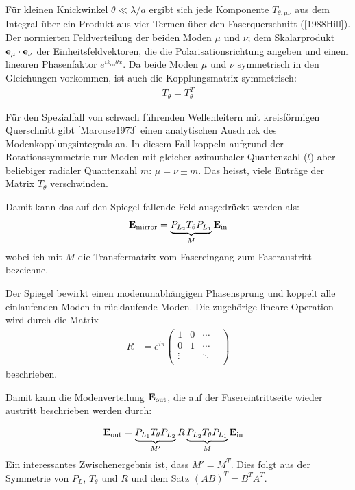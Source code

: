 \documentclass{article}
\begin{document}
F\"ur kleinen Knickwinkel $\theta \ll \lambda/a$ ergibt sich jede
Komponente $T_{\theta,\mu\nu}$ aus dem Integral \"uber ein Produkt aus
vier Termen \"uber den Faserquerschnitt ([1988Hill]). Der normierten
Feldverteilung der beiden Moden $\mu$ und $\nu$; dem Skalarprodukt
${\bf e_\mu\cdot e_\nu}$ der Einheitsfeldvektoren, die die
Polarisationsrichtung angeben und einem linearen Phasenfaktor
$e^{ik_\textrm{co}\theta x}$. Da beide Moden $\mu$ und $\nu$
symmetrisch in den Gleichungen vorkommen, ist auch die Kopplungsmatrix
symmetrisch:
\begin{align}
  T_\theta=T_\theta^T  
\end{align}


F\"ur den Spezialfall von schwach f\"uhrenden Wellenleitern mit
kreisf\"ormigen Querschnitt gibt [Marcuse1973] einen analytischen
Ausdruck des Modenkopplungsintegrals an. In diesem Fall koppeln
aufgrund der Rotationssymmetrie nur Moden mit gleicher azimuthaler
Quantenzahl ($l$) aber beliebiger radialer Quantenzahl $m$:
$\mu=\nu\pm m$. Das heisst, viele Entr\"age der Matrix $T_\theta$
verschwinden.

Damit kann das auf den Spiegel fallende Feld ausgedr\"uckt werden als:
\begin{align}
  {\bf E_\textrm{mirror}}= \underbrace{P_{L_2} T_\theta P_{L_1}}_M {\bf E_\textrm{in}} 
\end{align}
wobei ich mit $M$ die Transfermatrix vom Fasereingang zum
Faseraustritt bezeichne.

Der Spiegel bewirkt einen modenunabh\"angigen Phasensprung und koppelt
alle einlaufenden Moden in r\"ucklaufende Moden. Die zugeh\"orige
lineare Operation wird durch die Matrix 
\begin{align}
  R&=e^{i\pi}
  \begin{pmatrix}
    1 & 0 & \cdots  \\
  0 & 1 & \cdots  \\
  \vdots            &  & \ddots &   \\
 \end{pmatrix}
\end{align}
beschrieben.

Damit kann die Modenverteilung ${\bf E_\textrm{out}}$, die auf der
Fasereintrittseite wieder austritt beschrieben werden durch:

\begin{align}
  {\bf E_\textrm{out}} &=  \underbrace{P_{L_1} T_\theta P_{L_2}}_{M'} R  \underbrace{P_{L_2} T_\theta P_{L_1}}_M  {\bf E_\textrm{in}}
\end{align}
Ein interessantes Zwischenergebnis ist, dass $M'=M^T$. Dies
folgt aus der Symmetrie von $P_L$, $T_\theta$ und $R$ und dem Satz
$(AB)^T=B^TA^T$.
\end{document}

